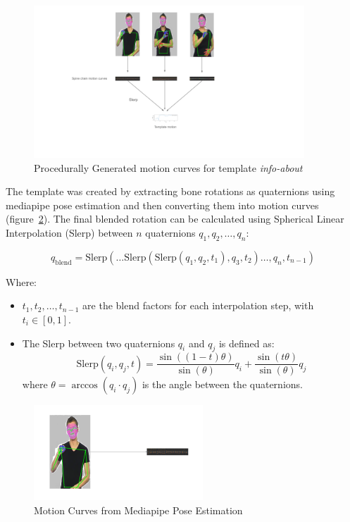 \documentclass[../../main.tex]{subfiles}
\begin{document}
\begin{figure}
    \centering \includegraphics[width = 4in]{chapters/intermediate_blocks/images/motion_curves_template_procedural.png}
    \caption{Procedurally Generated motion curves for template \emph{info-about}}
    \label{fig:motion_curves_template_procedural}
\end{figure}

The template was created by extracting bone rotations as quaternions using mediapipe pose estimation and then converting them into motion curves (figure~\ref{fig:motion_curves_mediapipe}). The final blended rotation can be calculated using Spherical Linear Interpolation (Slerp) between \( n \) quaternions \( q_1, q_2, \dots, q_n \):

\[
q_{\text{blend}} = \text{Slerp}\left(\dots \text{Slerp}\left(\text{Slerp}(q_1, q_2, t_1), q_3, t_2 \right) \dots , q_n, t_{n-1} \right)
\]

Where:
\begin{itemize}
    \item \( t_1, t_2, \dots, t_{n-1} \) are the blend factors for each interpolation step, with \( t_i \in [0, 1] \).
    \item The Slerp between two quaternions \( q_i \) and \( q_j \) is defined as:
    \[
    \text{Slerp}(q_i, q_j, t) = \frac{\sin((1-t)\theta)}{\sin(\theta)} q_i + \frac{\sin(t\theta)}{\sin(\theta)} q_j
    \]
    where \( \theta = \arccos(q_i \cdot q_j) \) is the angle between the quaternions.
\end{itemize}

\begin{figure}
    \centering \includegraphics[width = 2.5in]{chapters/intermediate_blocks/images/motion_curves_mediapipe.png}
    \caption{Motion Curves from Mediapipe Pose Estimation}
    \label{fig:motion_curves_mediapipe}
\end{figure}
\end{document}
